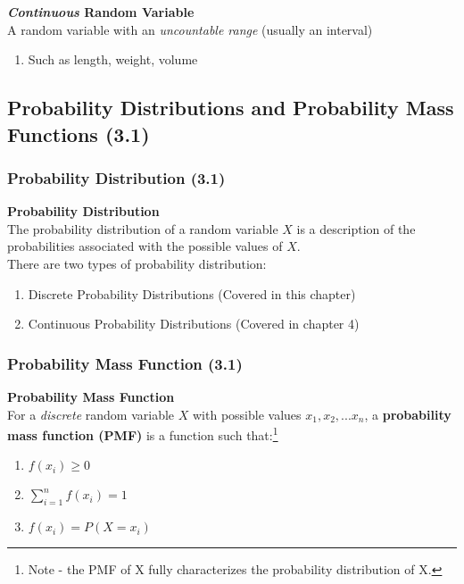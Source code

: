 \documentclass[../INDE315.tex]{subfiles}
\begin{document}
\begin{defn}
    \textbf{\emph{Continuous} Random Variable} \\
    A random variable with an \emph{uncountable range} (usually an interval)
    \begin{enumerate}
        \item Such as length, weight, volume
    \end{enumerate}
\end{defn}

\subsection*{Probability Distributions and Probability Mass Functions (3.1)}

\subsubsection*{Probability Distribution (3.1)}
\begin{defn}
    \textbf{Probability Distribution} \\
    The probability distribution of a random variable $X$ is a description of the probabilities associated with the possible values of $X$. \\
    There are two types of probability distribution:
    \begin{enumerate}
        \item Discrete Probability Distributions (Covered in this chapter)
        \item Continuous Probability Distributions (Covered in chapter 4)
    \end{enumerate}
\end{defn}

\subsubsection*{Probability Mass Function (3.1)}
\begin{defn}
    \textbf{Probability Mass Function} \\
    For a \emph{discrete} random variable $X$ with possible values $x_1, x_2, ...x_n$, a \textbf{probability mass function (PMF)} is a function such that:\footnote{Note - the PMF of X fully characterizes the probability distribution of X.}
    \begin{enumerate}
        \item $f(x_i) \geq 0$
        \item $\sum_{i=1}^{n} f(x_i) = 1$
        \item $f(x_i) = P(X = x_i)$
    \end{enumerate}
\end{defn}
\end{document}

